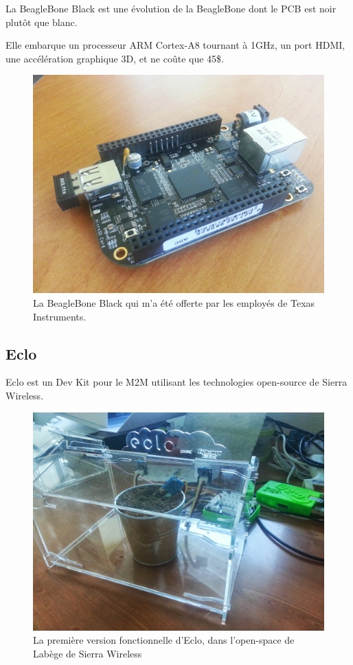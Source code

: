 \documentclass{article}
\begin{document}
La BeagleBone Black est une évolution de la BeagleBone dont le PCB est noir plutôt que blanc.

Elle embarque un processeur ARM Cortex-A8 tournant à 1GHz, un port HDMI, une accélération graphique 3D, et ne coûte que 45\$.

\begin{figure}[h!]
    \centering\includegraphics[width=\linewidth/2]{img/bbb.jpg}
    \caption{La BeagleBone Black qui m’a été offerte par les employés de Texas Instruments.}
\end{figure}

\clearpage

\subsection{Eclo}
\label{eclo}

Eclo est un Dev Kit pour le M2M utilisant les technologies open-source de Sierra Wireless.


\begin{figure}[h!]
    \centering\includegraphics[width=\linewidth*2/3]{img/eclo.jpg}
    \caption{La première version fonctionnelle d’Eclo, dans l’open-space de Labège de Sierra Wireless}
\end{figure}
\end{document}
